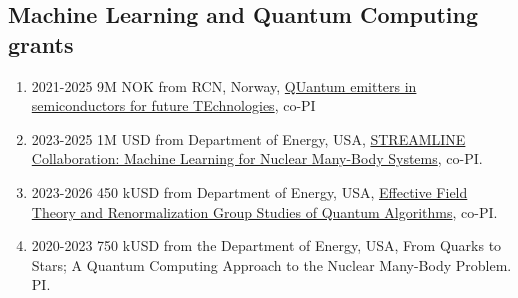 \documentclass[%
oneside,                 %
final,                   %
10pt]{article}
\begin{document}
\subsection{Machine Learning and Quantum Computing grants}

\begin{enumerate}
\item 2021-2025 9M NOK from RCN, Norway, \href{{https://www.mn.uio.no/smn/english/research/projects/physics/325573-qute/index.html}}{QUantum emitters in semiconductors for future TEchnologies}, co-PI

\item 2023-2025 1M USD from Department of Energy, USA, \href{{https://frib.msu.edu/news/2023/machine-learning.html#:~:text=For%

\item 2023-2026 450 kUSD from Department of Energy, USA, \href{{https://frib.msu.edu/news/2023/quantum-computing.html}}{Effective Field Theory and Renormalization Group Studies of Quantum Algorithms}, co-PI.

\item 2020-2023 750 kUSD from the Department of Energy, USA, From Quarks to Stars; A Quantum Computing Approach to the Nuclear Many-Body Problem. PI.
\end{enumerate}

\noindent


\end{document}

